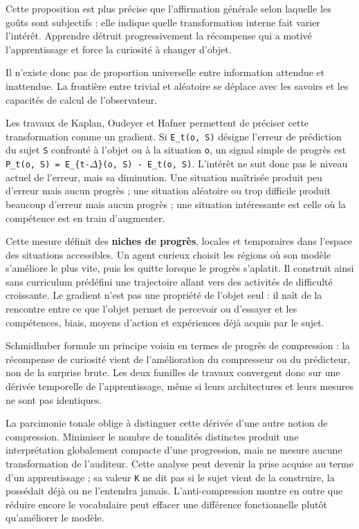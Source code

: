 \documentclass[10pt,a4paper]{article}
\begin{document}
Cette proposition est plus précise que l'affirmation générale selon laquelle les goûts sont subjectifs : elle indique quelle transformation interne fait varier l'intérêt. Apprendre détruit progressivement la récompense qui a motivé l'apprentissage et force la curiosité à changer d'objet.

Il n'existe donc pas de proportion universelle entre information attendue et inattendue. La frontière entre trivial et aléatoire se déplace avec les savoirs et les capacités de calcul de l'observateur.

Les travaux de Kaplan, Oudeyer et Hafner permettent de préciser cette transformation comme un gradient. Si \texttt{E\_t(o, S)} désigne l'erreur de prédiction du sujet \texttt{S} confronté à l'objet ou à la situation \texttt{o}, un signal simple de progrès est \texttt{P\_t(o, S) = E\_\{t-\ensuremath{\Delta}\}(o, S) - E\_t(o, S)}. L'intérêt ne suit donc pas le niveau actuel de l'erreur, mais sa diminution. Une situation maîtrisée produit peu d'erreur mais aucun progrès ; une situation aléatoire ou trop difficile produit beaucoup d'erreur mais aucun progrès ; une situation intéressante est celle où la compétence est en train d'augmenter.

Cette mesure définit des \textbf{niches de progrès}, locales et temporaires dans l'espace des situations accessibles. Un agent curieux choisit les régions où son modèle s'améliore le plus vite, puis les quitte lorsque le progrès s'aplatit. Il construit ainsi sans curriculum prédéfini une trajectoire allant vers des activités de difficulté croissante. Le gradient n'est pas une propriété de l'objet seul : il naît de la rencontre entre ce que l'objet permet de percevoir ou d'essayer et les compétences, biais, moyens d'action et expériences déjà acquis par le sujet.

Schmidhuber formule un principe voisin en termes de progrès de compression : la récompense de curiosité vient de l'amélioration du compresseur ou du prédicteur, non de la surprise brute. Les deux familles de travaux convergent donc sur une dérivée temporelle de l'apprentissage, même si leurs architectures et leurs mesures ne sont pas identiques.

La parcimonie tonale oblige à distinguer cette dérivée d'une autre notion de compression. Minimiser le nombre de tonalités distinctes produit une interprétation globalement compacte d'une progression, mais ne mesure aucune transformation de l'auditeur. Cette analyse peut devenir la prise acquise au terme d'un apprentissage ; sa valeur \texttt{K} ne dit pas si le sujet vient de la construire, la possédait déjà ou ne l'entendra jamais. L'anti-compression montre en outre que réduire encore le vocabulaire peut effacer une différence fonctionnelle plutôt qu'améliorer le modèle.
\end{document}
